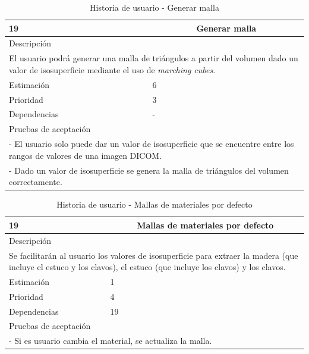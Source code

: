 \begin{table}[H]
	\begin{center}
		\begin{tabular} {|l|c|l|}
			\hline
			19 & \multicolumn{2}{c|}{Generar malla} \\ \hline \hline
			\multicolumn{3}{|l|}{Descripción} \\ \hline
			\multicolumn{3}{|p{12cm}|}{El usuario podrá generar una malla de triángulos a partir del volumen dado un valor de isosuperficie mediante el uso de \textit{marching cubes}.} \\ \hline
			\multicolumn{2}{|l|}{Estimación} & 6 \\ \hline
			\multicolumn{2}{|l|}{Prioridad} & 3 \\ \hline
			\multicolumn{2}{|l|}{Dependencias} & - \\ \hline
			\multicolumn{3}{|l|}{Pruebas de aceptación} \\ \hline
			\multicolumn{3}{|p{12cm}|}{ - El usuario solo puede dar un valor de isosuperficie que se encuentre entre los rangos de valores de una imagen DICOM.} \\ 
			\multicolumn{3}{|p{12cm}|}{ - Dado un valor de isosuperficie se genera la malla de triángulos del volumen correctamente.} \\ \hline
		\end{tabular}
	\end{center}
	\caption{Historia de usuario - Generar malla}
	\label{tab:hu_generar_malla}
\end{table}

\begin{table}[H]
	\begin{center}
		\begin{tabular} {|l|c|l|}
			\hline
			19 & \multicolumn{2}{c|}{Mallas de materiales por defecto} \\ \hline \hline
			\multicolumn{3}{|l|}{Descripción} \\ \hline
			\multicolumn{3}{|p{12cm}|}{Se facilitarán al usuario los valores de isosuperficie para extraer la madera (que incluye el estuco y los clavos), el estuco (que incluye los clavos) y los clavos.} \\ \hline
			\multicolumn{2}{|l|}{Estimación} & 1 \\ \hline
			\multicolumn{2}{|l|}{Prioridad} & 4 \\ \hline
			\multicolumn{2}{|l|}{Dependencias} & 19 \\ \hline
			\multicolumn{3}{|l|}{Pruebas de aceptación} \\ \hline
			\multicolumn{3}{|p{12cm}|}{ - Si es usuario cambia el material, se actualiza la malla.} \\ \hline
		\end{tabular}
	\end{center}
	\caption{Historia de usuario - Mallas de materiales por defecto}
	\label{tab:hu_mallas_de_materiales_por_defecto}
\end{table}

